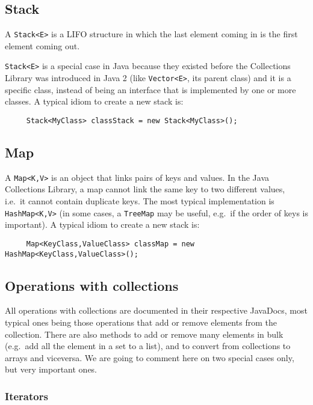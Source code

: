 \subsection{Stack}
\label{sec:stack}

A \verb+Stack<E>+ is a LIFO structure in which the last element coming in
is the first element coming out. 

\verb+Stack<E>+ is a special case in Java because they existed before the
Collections Library was introduced in Java 2 (like \verb+Vector<E>+, its
parent class) and it is a specific class, instead of being an
interface that is implemented by one or more classes. A typical idiom to
create a new stack is:

\begin{verbatim}
     Stack<MyClass> classStack = new Stack<MyClass>();
\end{verbatim}

\subsection{Map}
\label{sec:maps}

A \verb+Map<K,V>+ is an object that links pairs of keys and values. In
the Java Collections Library, a map cannot link the same key to two
different values, i.e.~it cannot contain duplicate keys. The most
typical implementation is \verb+HashMap<K,V>+ (in some cases, a
\verb+TreeMap+ may be useful, e.g.~if the order of keys is
important). A typical idiom to
create a new stack is:

\begin{verbatim}
     Map<KeyClass,ValueClass> classMap = new HashMap<KeyClass,ValueClass>();
\end{verbatim}



\subsection{Operations with collections}
\label{sec:oper-with-coll}

All operations with collections are documented in their respective
JavaDocs, most typical ones being those operations that add or remove
elements from the collection. There are also methods to add or remove
many elements in bulk (e.g.~add all the element in a set to a list),
and to convert from collections to arrays and viceversa.  We are going
to comment here on two special cases only, but very important ones. 

\subsubsection{Iterators}
\label{sec:iterators}

